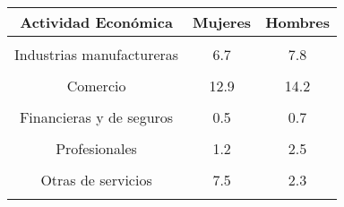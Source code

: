 \begin{tabular}[t]{ccc}
\toprule
\textbf{Actividad Económica} & \textbf{Mujeres} & \textbf{Hombres}\\
\midrule
\cellcolor[HTML]{B6B3FF}{Agricultura} & \cellcolor[HTML]{B6B3FF}{3.7} & \cellcolor[HTML]{B6B3FF}{23.4}\\
Industrias manufactureras & 6.7 & 7.8\\
\cellcolor[HTML]{B6B3FF}{Construcción} & \cellcolor[HTML]{B6B3FF}{0.0} & \cellcolor[HTML]{B6B3FF}{7.4}\\
Comercio & 12.9 & 14.2\\
\cellcolor[HTML]{B6B3FF}{Comunicaciones} & \cellcolor[HTML]{B6B3FF}{0.1} & \cellcolor[HTML]{B6B3FF}{0.5}\\
Financieras y de seguros & 0.5 & 0.7\\
\cellcolor[HTML]{B6B3FF}{Inmobiliarias} & \cellcolor[HTML]{B6B3FF}{0.2} & \cellcolor[HTML]{B6B3FF}{0.2}\\
Profesionales & 1.2 & 2.5\\
\cellcolor[HTML]{B6B3FF}{Administración pública} & \cellcolor[HTML]{B6B3FF}{4.1} & \cellcolor[HTML]{B6B3FF}{3.8}\\
Otras de servicios & 7.5 & 2.3\\
\cellcolor[HTML]{B6B3FF}{NS/NR} & \cellcolor[HTML]{B6B3FF}{0.1} & \cellcolor[HTML]{B6B3FF}{0.1}\\
\bottomrule
\end{tabular}
